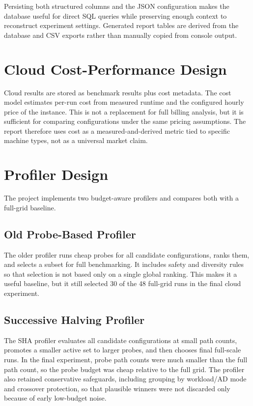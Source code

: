 Persisting both structured columns and the JSON configuration makes the database useful for direct SQL queries while preserving enough context to reconstruct experiment settings. Generated report tables are derived from the database and CSV exports rather than manually copied from console output.

\section{Cloud Cost-Performance Design}

Cloud results are stored as benchmark results plus cost metadata. The cost model estimates per-run cost from measured runtime and the configured hourly price of the instance. This is not a replacement for full billing analysis, but it is sufficient for comparing configurations under the same pricing assumptions. The report therefore uses cost as a measured-and-derived metric tied to specific machine types, not as a universal market claim.

\section{Profiler Design}

The project implements two budget-aware profilers and compares both with a full-grid baseline.

\subsection{Old Probe-Based Profiler}

The older profiler runs cheap probes for all candidate configurations, ranks them, and selects a subset for full benchmarking. It includes safety and diversity rules so that selection is not based only on a single global ranking. This makes it a useful baseline, but it still selected 30 of the 48 full-grid runs in the final cloud experiment.

\subsection{Successive Halving Profiler}

The SHA profiler evaluates all candidate configurations at small path counts, promotes a smaller active set to larger probes, and then chooses final full-scale runs. In the final experiment, probe path counts were much smaller than the full path count, so the probe budget was cheap relative to the full grid. The profiler also retained conservative safeguards, including grouping by workload/AD mode and crossover protection, so that plausible winners were not discarded only because of early low-budget noise.

